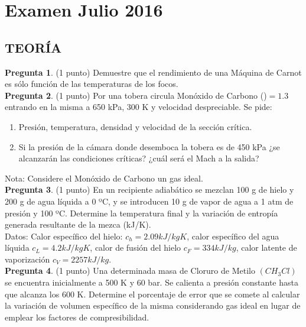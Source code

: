 \documentclass[12pt]{article}
\begin{document}
\section{Examen Julio 2016}
\subsection{TEORÍA}
\textbf{Pregunta 1}. (1 punto) Demuestre que el rendimiento de una Máquina de Carnot es sólo función de las temperaturas de los focos.
\\
\textbf{Pregunta 2}. (1 punto) Por una tobera circula Monóxido de Carbono (\gamma)$=1.3$ entrando en la misma a 650 kPa, 300 K y velocidad despreciable. Se pide:
\begin{enumerate}
    \item Presión, temperatura, densidad y velocidad de la sección crítica.
    \item Si la presión de la cámara donde desemboca la tobera es de 450 kPa ¿se alcanzarán las condiciones críticas? ¿cuál será el Mach a la salida?
\end{enumerate}
Nota: Considere el Monóxido de Carbono un gas ideal.
\\
\textbf{Pregunta 3}. (1 punto) En un recipiente adiabático se mezclan 100 g de hielo y 200 g de agua líquida a 0 ºC, y se introducen 10 g de vapor de agua a 1 atm de presión y 100 ºC. Determine la temperatura final y la variación de entropía generada resultante de la mezca (kJ/K).
\\
Datos: Calor específico del hielo: $c_{h} = 2.09 kJ/kg K$, calor específico del agua líquida $c_{L}= 4.2 kJ/kg K$, calor de fusión del hielo
$c_{F}=334 kJ/kg$, calor latente de vaporización $c_{V} = 2257 kJ/kg$.
\\
\textbf{Pregunta 4}. (1 punto) Una determinada masa de Cloruro de Metilo $(CH_{3}Cl)$ se encuentra inicialmente a 500 K y 60 bar. Se calienta a presión constante hasta que alcanza los 600 K. Determine el porcentaje de error que se comete al calcular la variación de volumen específico de la misma considerando gas ideal en lugar de emplear los factores de compresibilidad.
\\
\end{document}
